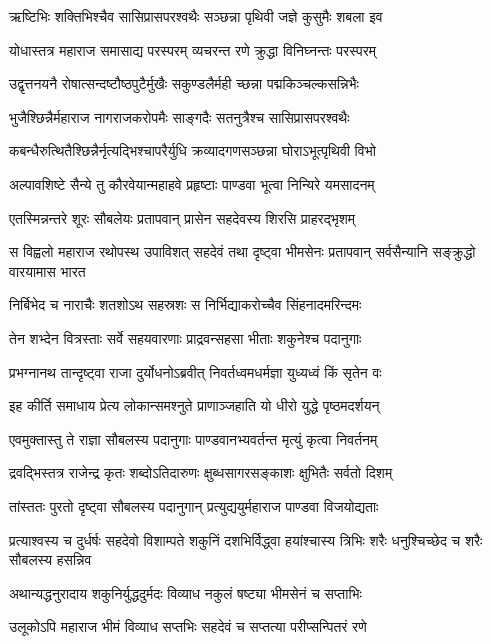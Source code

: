 \twolineshloka
{ऋष्टिभिः शक्तिभिश्चैव सासिप्रासपरश्वथैः}
{सञ्छन्ना पृथिवी जज्ञे कुसुमैः शबला इव}


\twolineshloka
{योधास्तत्र महाराज समासाद्य परस्परम्}
{व्यचरन्त रणे क्रुद्धा विनिघ्नन्तः परस्परम्}


\twolineshloka
{उद्वृत्तनयनै रोषात्सन्दष्टौष्ठपुटैर्मुखैः}
{सकुण्डलैर्मही च्छन्ना पद्मकिञ्चल्कसन्निभैः}


\twolineshloka
{भुजैश्छिन्नैर्महाराज नागराजकरोपमैः}
{साङ्गदैः सतनुत्रैश्च सासिप्रासपरश्वथैः}


\twolineshloka
{कबन्धैरुत्थितैश्छिन्नैर्नृत्यद्भिश्चापरैर्युधि}
{क्रव्यादगणसञ्छन्ना घोराऽभूत्पृथिवी विभो}


\twolineshloka
{अल्पावशिष्टे सैन्ये तु कौरवेयान्महाहवे}
{प्रहृष्टाः पाण्डवा भूत्वा निन्यिरे यमसादनम्}


\twolineshloka
{एतस्मिन्नन्तरे शूरः सौबलेयः प्रतापवान्}
{प्रासेन सहदेवस्य शिरसि प्राहरद्भृशम्}


स विह्वलो महाराज रथोपस्थ उपाविशत्
\twolineshloka
{सहदेवं तथा दृष्ट्वा भीमसेनः प्रतापवान्}
{सर्वसैन्यानि सङ्क्रुद्धो वारयामास भारत}


\twolineshloka
{निर्बिभेद च नाराचैः शतशोऽथ सहस्रशः}
{स निर्भिद्याकरोच्चैव सिंहनादमरिन्दमः}


\twolineshloka
{तेन शभ्देन वित्रस्ताः सर्वे सहयवारणाः}
{प्राद्रवन्सहसा भीताः शकुनेश्च पदानुगाः}


\twolineshloka
{प्रभग्नानथ तान्दृष्ट्वा राजा दुर्योधनोऽब्रवीत्}
{निवर्तध्वमधर्मज्ञा युध्यध्वं किं सृतेन वः}


\twolineshloka
{इह कीर्ति समाधाय प्रेत्य लोकान्समश्नुते}
{प्राणाञ्जहाति यो धीरो युद्धे पृष्ठमदर्शयन्}


\twolineshloka
{एवमुक्तास्तु ते राज्ञा सौबलस्य पदानुगाः}
{पाण्डवानभ्यवर्तन्त मृत्युं कृत्वा निवर्तनम्}


\twolineshloka
{द्रवद्भिस्तत्र राजेन्द्र कृतः शब्दोऽतिदारुणः}
{क्षुब्धसागरसङ्काशः क्षुभितैः सर्वतो दिशम्}


\twolineshloka
{तांस्ततः पुरतो दृष्ट्वा सौबलस्य पदानुगान्}
{प्रत्युद्ययुर्महाराज पाण्डवा विजयोद्यताः}


\threelineshloka
{प्रत्याश्वस्य च दुर्धर्षः सहदेवो विशाम्पते}
{शकुनिं दशभिर्विद्ध्वा हयांश्चास्य त्रिभिः शरैः}
{धनुश्चिच्छेद च शरैः सौबलस्य हसन्निव}


\twolineshloka
{अथान्यद्धनुरादाय शकुनिर्युद्धदुर्मदः}
{विव्याध नकुलं षष्ट्या भीमसेनं च सप्ताभिः}


\twolineshloka
{उलूकोऽपि महाराज भीमं विव्याध सप्तभिः}
{सहदेवं च सप्तत्या परीप्सन्पितरं रणे}


